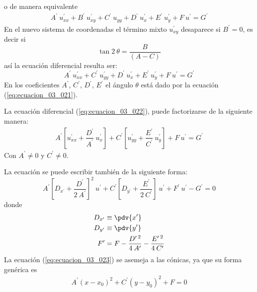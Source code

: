 o de manera equivalente
\begin{align*}
A^{\prime} \: u_{xx}^{\prime} + B^{\prime} \: u_{xy}^{\prime} + C^{\prime} \: u_{yy} + D^{\prime} \: u_{x}^{\prime} + E^{\prime} \: u_{y}^{\prime} + F \: u^{\prime} = G^{\prime}
\end{align*}
En el nuevo sistema de coordenadas el término mixto $u_{xy}^{\prime}$ desaparece si $B^{\prime} = 0$, es decir si
\begin{equation}
\tan 2 \: \theta = \dfrac{B}{(A - C)}
\label{eq:ecuacion_03_021}
\end{equation}
así la ecuación diferencial resulta ser:
\begin{equation}
A^{\prime} \: u_{xx}^{\prime} + C^{\prime} \: u_{yy}^{\prime} + D^{\prime} \: u_{x}^{\prime} + E^{\prime} \: u_{y}^{\prime} + F \: u^{\prime} = G^{\prime}
\label{eq:ecuacion_03_022}
\end{equation}
En los coeficientes $A^{\prime}$, $C^{\prime}$, $D^{\prime}$, $E^{\prime}$ el ángulo $\theta$ está dado por la ecuación (\ref{eq:ecuacion_03_021}).
\par
La ecuación diferencial (\ref{eq:ecuacion_03_022}), puede factorizarse de la siguiente manera:
\begin{align*}
A^{\prime} \left[ u_{xx}^{\prime} + \dfrac{D^{\prime}}{A^{\prime}} \: u_{x}^{\prime} \right] + C^{\prime} \left[ u_{yy}^{\prime} + \dfrac{E^{\prime}}{C^{\prime}} \: u_{y}^{\prime}  \right] + F \: u^{\prime} = G^{\prime}
\end{align*}
Con $A^{\prime} \neq 0$ y $C^{\prime} \neq 0$.
\par
La ecuación se puede escribir también de la siguiente forma:
\begin{equation}
A^{\prime} \left[ D_{x^\prime} + \dfrac{D^{\prime}}{2 \: A^{\prime}} \right]^{2} \: u^{\prime} + C^{\prime} \left[ D_{y^\prime} + \dfrac{E^{\prime}}{2 \: C^{\prime}} \right] \: u^{\prime} + F^{\prime} \: u^{\prime} - G^{\prime} = 0
\label{eq:ecuacion_03_023}
\end{equation}
donde
\begin{align*}
D_{x^{\prime}} &\equiv \pdv{x^{\prime}} \\
D_{y^{\prime}} &\equiv \pdv{y^{\prime}} \\
F^{\prime} &= F - \dfrac{D^{\prime \: 2}}{4 \: A^{\prime}} - \dfrac{E^{\prime \: 2}}{4 \: C^{\prime}} 
\end{align*}
La ecuación (\ref{eq:ecuacion_03_023}) se asemeja a las cónicas, ya que su forma genérica es
\begin{align*}
A^{\prime} (x - x_{0})^{2} + C^{\prime} (y - y_{0})^{2} + F = 0 
\end{align*}
